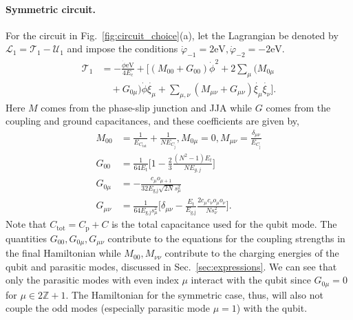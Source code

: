 \documentclass[%
reprint,
superscriptaddress,
 amsmath,amssymb,
 aps,
 prx,
longbibliography,
floatfix,
]{revtex4-2}
\begin{document}
\paragraph{Symmetric circuit.} For the circuit in Fig.~\ref{fig:circuit_choice}(a), let the Lagrangian be denoted by $\mathcal{L}_1=\mathcal{T}_1-\mathcal{U}_1$ and impose the conditions $\dot{\varphi}_{-1}=2\textrm{eV},\dot{\varphi}_{-2}=-2\textrm{eV}$.
    \begin{align}
\mathcal{T}_1&=-\frac{\dot{\phi}\textrm{eV}}{4E_{\textrm{c}}}+\Big[(M_{00}+G_{00})\dot{\phi}^2+2\sum_{\mu}(M_{0\mu}\nonumber\\&\quad+G_{0\mu})\dot{\phi}\dot{\xi_\mu}+\sum_{\mu,\nu}(M_{\mu\nu}+G_{\mu\nu})\dot{\xi_\mu}\dot{\xi_\nu}\Big].\end{align}
Here $M$ comes from the phase-slip junction and JJA while $G$ comes from the coupling and ground capacitances, and these coefficients are given by,
\begin{align}
M_{00}&=\frac{1}{E_{C_\textrm{tot}}}+\frac{1}{NE_{C_\textrm{j}}}, M_{0\mu}=0,    M_{\mu\nu}=\frac{\delta_{\mu\nu}}{E_{C_\textrm{j}}}\\
G_{00}&=\frac{1}{64E_{\textrm{t}}}\Big[1-\frac{2}{3}\frac{(N^2-1)E_t}{NE_{g,j}}\Big]\\
G_{0\mu}&=-\frac{c_\mu o_{\mu+1}}{32E_{\textrm{g,j}}\sqrt{2N}s_\mu^2}\\
G_{\mu\nu}&=\frac{1}{64E_{\textrm{g,j}}s_\mu^2}\Big[\delta_{\mu\nu}-\frac{E_{\textrm{t}}}{E_{\textrm{g,j}}}\frac{2c_\mu c_\nu o_\mu o_\nu}{N s_\nu^2}\Big].
\end{align}
Note that $C_\textrm{tot}=C_\textrm{p}+C$ is the total capacitance used for the qubit mode. The quantities $G_{00},G_{0\mu},G_{\mu\nu}$ contribute to the equations for the coupling strengths in the final Hamiltonian while $M_{00},M_{\nu\nu}$ contribute to the charging energies of the qubit and parasitic modes, discussed in Sec.~\ref{sec:expressions}. We can see that only the parasitic modes with even index $\mu$ interact with the qubit since $G_{0\mu}=0$ for $\mu\in 2\mathbb{Z}+1$. The Hamiltonian for the symmetric case, thus, will also not couple the odd modes (especially  parasitic mode $\mu=1$) with the qubit. 
\end{document}

